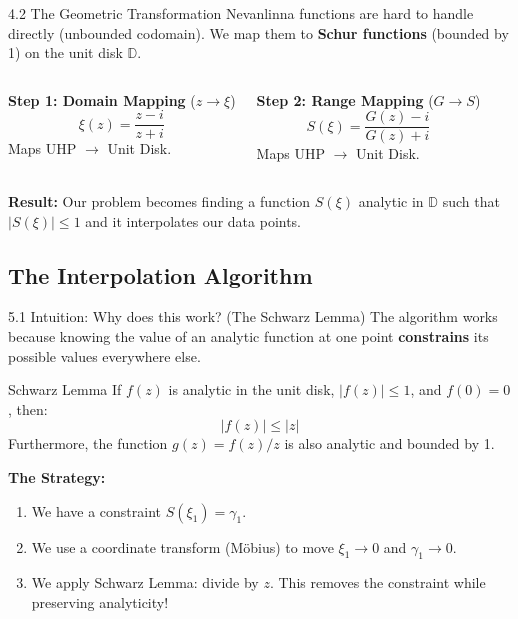 \documentclass[aspectratio=169, 11pt]{beamer}
\begin{document}
\begin{frame}{4.2 The Geometric Transformation}
    Nevanlinna functions are hard to handle directly (unbounded codomain). We map them to \textbf{Schur functions} (bounded by 1) on the unit disk $\mathbb{D}$.

    \begin{columns}
        \textbf{Step 1: Domain Mapping} ($z \to \xi$)
        $$ \xi(z) = \frac{z - i}{z + i} $$
        Maps UHP $\to$ Unit Disk.
        
        \textbf{Step 2: Range Mapping} ($G \to S$)
        $$ S(\xi) = \frac{G(z) - i}{G(z) + i} $$
        Maps UHP $\to$ Unit Disk.
    \end{columns}
    
    \vspace{0.5cm}
    \textbf{Result:} Our problem becomes finding a function $S(\xi)$ analytic in $\mathbb{D}$ such that $|S(\xi)| \le 1$ and it interpolates our data points.
\end{frame}

\subsection{The Interpolation Algorithm}

\begin{frame}{5.1 Intuition: Why does this work? (The Schwarz Lemma)}
    The algorithm works because knowing the value of an analytic function at one point \textbf{constrains} its possible values everywhere else.
    
    \begin{block}{Schwarz Lemma}
        If $f(z)$ is analytic in the unit disk, $|f(z)| \le 1$, and $f(0) = 0$, then:
        $$ |f(z)| \le |z| $$
        Furthermore, the function $g(z) = f(z)/z$ is also analytic and bounded by 1.
    \end{block}
    
    \textbf{The Strategy:}
    \begin{enumerate}
        \item We have a constraint $S(\xi_1) = \gamma_1$.
        \item We use a coordinate transform (Möbius) to move $\xi_1 \to 0$ and $\gamma_1 \to 0$.
        \item We apply Schwarz Lemma: divide by $z$. This removes the constraint while preserving analyticity!
    \end{enumerate}
\end{frame}
\end{document}

